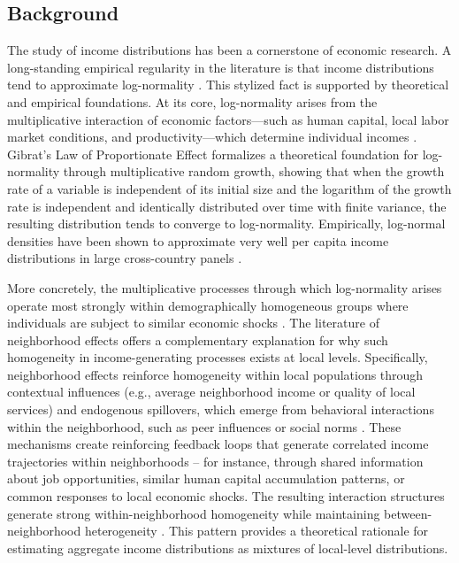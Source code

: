 
\subsection{Background}

The study of income distributions has been a cornerstone of economic research. A long-standing empirical regularity in the literature is that income distributions tend to approximate log-normality \citep{aitchison1957lognormal}. This stylized fact is supported by theoretical and empirical foundations. At its core, log-normality arises from the multiplicative interaction of economic factors—such as human capital, local labor market conditions, and productivity—which determine individual incomes \citep{neal2000theories}. Gibrat's Law of Proportionate Effect \citep{gibrat1931inegalites} formalizes a theoretical foundation for log-normality through multiplicative random growth, showing that when the growth rate of a variable is independent of its initial size and the logarithm of the growth rate is independent and identically distributed over time with finite variance, the resulting distribution tends to converge to log-normality. Empirically, log-normal densities have been shown to approximate very well per capita income distributions in large cross-country panels \citep{lopez2006normal}.

More concretely, the multiplicative processes through which log-normality arises operate most strongly within demographically homogeneous groups where individuals are subject to similar economic shocks \citep{battistin2009consumption}. The literature of neighborhood effects offers a complementary explanation for why such homogeneity in income-generating processes exists at local levels. Specifically, neighborhood effects reinforce homogeneity within local populations through contextual influences (e.g., average neighborhood income or quality of local services) and endogenous spillovers, which emerge from behavioral interactions within the neighborhood, such as peer influences or social norms \citep{manski1993identification, durlauf1996neighborhoods}. These mechanisms create reinforcing feedback loops that generate correlated income trajectories within neighborhoods -- for instance, through shared information about job opportunities, similar human capital accumulation patterns, or common responses to local economic shocks.  The resulting interaction structures generate strong within-neighborhood homogeneity while maintaining between-neighborhood heterogeneity \citep{durlauf2004neighborhood}. This pattern provides a theoretical rationale  for estimating aggregate income distributions as mixtures of local-level distributions.

